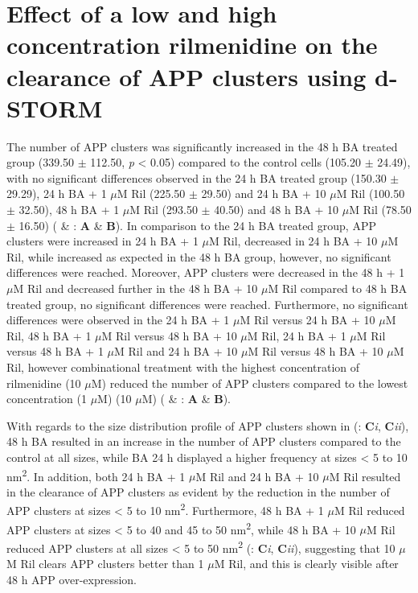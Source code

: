 \section{Effect of a low and high concentration rilmenidine on the clearance of APP clusters using d-STORM}
The number of APP clusters was significantly increased in the 48 h BA treated group (339.50 $\pm$ 112.50, \textit{p} < 0.05) compared to the control cells (105.20 $\pm$ 24.49), with no significant differences observed in the 24 h BA treated group (150.30 $\pm$ 29.29), 24 h BA + 1 $\mu$M Ril (225.50 $\pm$ 29.50) and 24 h BA + 10 $\mu$M Ril (100.50 $\pm$ 32.50), 48 h BA + 1 $\mu$M Ril (293.50 $\pm$ 40.50) and 48 h BA + 10 $\mu$M Ril (78.50 $\pm$ 16.50) ( \& : \textbf{A} \& \textbf{B}). In comparison to the 24 h BA treated group, APP clusters were increased in 24 h BA + 1 $\mu$M Ril, decreased in 24 h BA + 10 $\mu$M Ril, while increased as expected in the 48 h BA group, however, no significant differences were reached. Moreover, APP clusters were decreased in the 48 h + 1 $\mu$M Ril and decreased further in the 48 h BA + 10 $\mu$M Ril compared to 48 h BA treated group, no significant differences were reached. Furthermore, no significant differences were observed in the 24 h BA + 1 $\mu$M Ril versus 24 h BA + 10 $\mu$M Ril, 48 h BA + 1 $\mu$M Ril versus 48 h BA + 10 $\mu$M Ril, 24 h BA + 1 $\mu$M Ril versus 48 h BA + 1 $\mu$M Ril and 24 h BA + 10 $\mu$M Ril versus 48 h BA + 10 $\mu$M Ril, however combinational treatment with the highest concentration of rilmenidine (10 $\mu$M) reduced the number of APP clusters compared to the lowest concentration (1 $\mu$M) (10 $\mu$M) ( \& : \textbf{A} \& \textbf{B}).

With regards to the size distribution profile of APP clusters shown in  (: \textbf{C}\textit{i}, \textbf{C}\textit{ii}), 48 h BA resulted in an increase in the number of APP clusters compared to the control at all sizes, while BA 24 h displayed a higher frequency at sizes < 5 to 10 nm\textsuperscript{2}. In addition, both 24 h BA + 1 $\mu$M Ril and 24 h BA + 10 $\mu$M Ril resulted in the clearance of APP clusters as evident by the reduction in the number of APP clusters at sizes < 5 to 10 nm\textsuperscript{2}. Furthermore, 48 h BA + 1 $\mu$M Ril reduced APP clusters at sizes < 5 to 40 and 45 to 50 nm\textsuperscript{2}, while 48 h BA + 10 $\mu$M Ril reduced APP clusters at all sizes < 5 to 50 nm\textsuperscript{2}  (: \textbf{C}\textit{i}, \textbf{C}\textit{ii}), suggesting that 10 $\mu$M Ril clears APP clusters better than 1 $\mu$M Ril, and this is clearly visible after 48 h APP over-expression.

